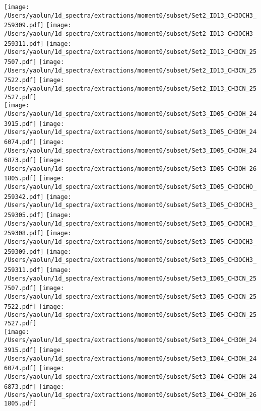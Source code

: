 \begin{figure*}[htbp!]
  \texttt{[image: /Users/yaolun/1d\_spectra/extractions/moment0/subset/Set2\_ID13\_CH3OCH3\_259309.pdf]}
  \texttt{[image: /Users/yaolun/1d\_spectra/extractions/moment0/subset/Set2\_ID13\_CH3OCH3\_259311.pdf]}
  \texttt{[image: /Users/yaolun/1d\_spectra/extractions/moment0/subset/Set2\_ID13\_CH3CN\_257507.pdf]}
  \texttt{[image: /Users/yaolun/1d\_spectra/extractions/moment0/subset/Set2\_ID13\_CH3CN\_257522.pdf]}
  \texttt{[image: /Users/yaolun/1d\_spectra/extractions/moment0/subset/Set2\_ID13\_CH3CN\_257527.pdf]}
  \\
  \texttt{[image: /Users/yaolun/1d\_spectra/extractions/moment0/subset/Set3\_ID05\_CH3OH\_243915.pdf]}
  \texttt{[image: /Users/yaolun/1d\_spectra/extractions/moment0/subset/Set3\_ID05\_CH3OH\_246074.pdf]}
  \texttt{[image: /Users/yaolun/1d\_spectra/extractions/moment0/subset/Set3\_ID05\_CH3OH\_246873.pdf]}
  \texttt{[image: /Users/yaolun/1d\_spectra/extractions/moment0/subset/Set3\_ID05\_CH3OH\_261805.pdf]}
  \texttt{[image: /Users/yaolun/1d\_spectra/extractions/moment0/subset/Set3\_ID05\_CH3OCHO\_259342.pdf]}
  \texttt{[image: /Users/yaolun/1d\_spectra/extractions/moment0/subset/Set3\_ID05\_CH3OCH3\_259305.pdf]}
  \texttt{[image: /Users/yaolun/1d\_spectra/extractions/moment0/subset/Set3\_ID05\_CH3OCH3\_259308.pdf]}
  \texttt{[image: /Users/yaolun/1d\_spectra/extractions/moment0/subset/Set3\_ID05\_CH3OCH3\_259309.pdf]}
  \texttt{[image: /Users/yaolun/1d\_spectra/extractions/moment0/subset/Set3\_ID05\_CH3OCH3\_259311.pdf]}
  \texttt{[image: /Users/yaolun/1d\_spectra/extractions/moment0/subset/Set3\_ID05\_CH3CN\_257507.pdf]}
  \texttt{[image: /Users/yaolun/1d\_spectra/extractions/moment0/subset/Set3\_ID05\_CH3CN\_257522.pdf]}
  \texttt{[image: /Users/yaolun/1d\_spectra/extractions/moment0/subset/Set3\_ID05\_CH3CN\_257527.pdf]}
  \\
  \texttt{[image: /Users/yaolun/1d\_spectra/extractions/moment0/subset/Set3\_ID04\_CH3OH\_243915.pdf]}
  \texttt{[image: /Users/yaolun/1d\_spectra/extractions/moment0/subset/Set3\_ID04\_CH3OH\_246074.pdf]}
  \texttt{[image: /Users/yaolun/1d\_spectra/extractions/moment0/subset/Set3\_ID04\_CH3OH\_246873.pdf]}
  \texttt{[image: /Users/yaolun/1d\_spectra/extractions/moment0/subset/Set3\_ID04\_CH3OH\_261805.pdf]}

\end{figure*}
